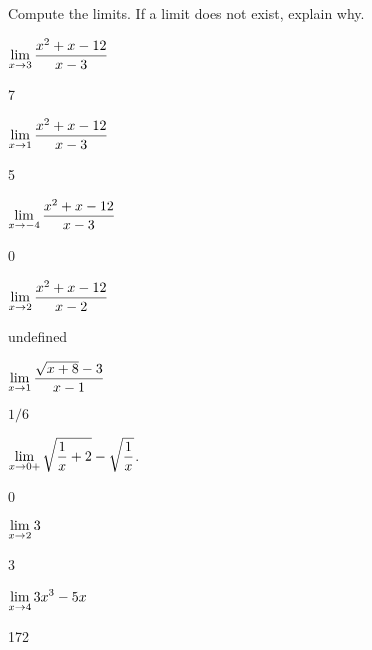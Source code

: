 \begin{exercises}

\noindent Compute the limits. If a limit does not exist, explain why.

\twocol

\begin{exercise} $\displaystyle \lim_{x\to 3}{x^2+x-12\over x-3}$
\begin{answer} 7
\end{answer}\end{exercise}

\begin{exercise} $\displaystyle \lim_{x\to 1}{x^2+x-12\over x-3}$
\begin{answer} 5
\end{answer}\end{exercise}

\begin{exercise} $\displaystyle \lim_{x\to -4}{x^2+x-12\over x-3}$
\begin{answer} 0
\end{answer}\end{exercise}

\begin{exercise} $\displaystyle \lim_{x\to 2} {x^2+x-12\over x-2}$
\begin{answer} undefined
\end{answer}\end{exercise}

\begin{exercise} $\displaystyle \lim_{x\to 1} {\sqrt{x+8}-3\over x-1}$
\begin{answer} $1/6$
\end{answer}\end{exercise}

\begin{exercise} $\displaystyle \lim_{x\to 0+} \sqrt{{1\over x}+2} - \sqrt{1\over x}$.
\begin{answer} 0
\end{answer}\end{exercise}

\begin{exercise} $\displaystyle\lim _{x\to 2} 3$
\begin{answer} 3
\end{answer}\end{exercise}

\begin{exercise} $\displaystyle\lim _{x\to 4 } 3x^3 - 5x $
\begin{answer} 172
\end{answer}\end{exercise}


\end{exercises}
